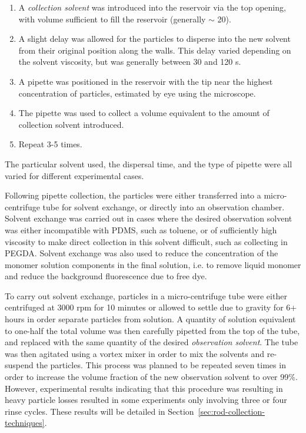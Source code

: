 \begin{enumerate}
\item A \textit{collection solvent} was introduced into the reservoir via the top opening, with volume sufficient to
fill the reservoir (generally $\sim$ 20\uL).
\item A slight delay was allowed for the particles to disperse into the new solvent from their 
original position along the 
walls. This delay varied depending on the solvent viscosity, but was generally between 30 and 120 s.
\item A pipette was positioned in the reservoir with the tip near the highest concentration of particles, estimated
by eye using the microscope.
\item The pipette was used to collect a volume equivalent to the amount of collection solvent introduced.
\item Repeat 3-5 times.
\end{enumerate}

The particular solvent used, the dispersal time, and the type of pipette were all varied for different experimental
cases.

Following pipette collection, the particles were either transferred into a micro-centrifuge tube for solvent 
exchange, or directly into an observation chamber.  Solvent exchange was carried out in cases where the desired
observation solvent was either incompatible with PDMS, such as toluene, or of sufficiently high viscosity to make
direct collection in this solvent difficult, such as collecting in PEGDA.  Solvent exchange was also used to reduce
the concentration of the monomer solution components in the final solution, i.e. to remove liquid monomer and 
reduce the background fluorescence due to free dye.

To carry out solvent exchange, particles in a micro-centrifuge tube were either centrifuged at 3000 rpm for 10 minutes or
allowed to settle due to gravity for 6+ hours in order separate particles from solution.  A quantity of solution equivalent
to one-half the total volume was then carefully pipetted from the top of the tube, and replaced with the same quantity of 
the desired \textit{observation solvent}.  The tube was then agitated using a vortex mixer in order to mix the solvents and
re-suspend the particles.  This process was planned to be repeated seven times in order to increase the volume fraction of
the new observation solvent to over 99\%.  However, experimental results indicating that this procedure was resulting in heavy
particle losses resulted in some experiments only involving three or four rinse cycles.  These results will be detailed in 
Section~\ref{sec:rod-collection-techniques}.

